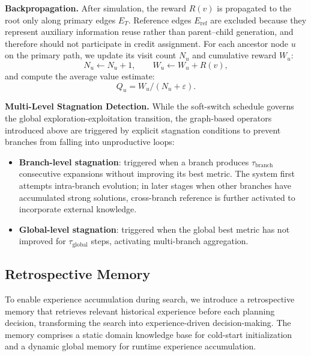 \textbf{Backpropagation.}
After simulation, the reward $R(v)$ is propagated to the root only along primary edges $E_T$. Reference edges $E_{\text{ref}}$ are excluded because they represent auxiliary information reuse rather than parent--child generation, and therefore should not participate in credit assignment. For each ancestor node $u$ on the primary path, we update its visit count $N_u$ and cumulative reward $W_u$:
\begin{equation}
N_u \leftarrow N_u + 1,\qquad W_u \leftarrow W_u + R(v),
\end{equation}
and compute the average value estimate:
\begin{equation}
\label{eq:backprop}
Q_u = W_u / (N_u + \varepsilon).
\end{equation}


\textbf{Multi-Level Stagnation Detection.}
\label{sec:stagnation}
While the soft-switch schedule governs the global exploration-exploitation transition, the graph-based operators introduced above are triggered by explicit stagnation conditions to prevent branches from falling into unproductive loops:

\begin{itemize}[leftmargin=*]
    \item \textbf{Branch-level stagnation}: triggered when a branch produces $\tau_{\text{branch}}$ consecutive expansions without improving its best metric. The system first attempts intra-branch evolution; in later stages when other branches have accumulated strong solutions, cross-branch reference is further activated to incorporate external knowledge.
    \item \textbf{Global-level stagnation}: triggered when the global best metric has not improved for $\tau_{\text{global}}$ steps, activating multi-branch aggregation.
\end{itemize}


\subsection{Retrospective Memory}
\label{sec:memory}

To enable experience accumulation during search, we introduce a retrospective memory that retrieves relevant historical experience before each planning decision, transforming the search into experience-driven decision-making. The memory comprises a static domain knowledge base for cold-start initialization and a dynamic global memory for runtime experience accumulation.

